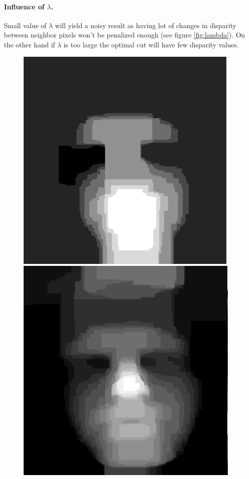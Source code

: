 \documentclass[]{article}
\begin{document}
\paragraph{Influence of $\lambda$.}
Small value of $\lambda$ will yield a noisy result as having lot of changes in disparity between neighbor pixels won't be penalized enough (see figure \ref{fig:lambda}). On the other hand if $\lambda$ is too large the optimal cut will have few disparity values.
\begin{figure}[h]
	\centering
	\begin{minipage}{0.24\linewidth}
		\includegraphics[width=\linewidth]{results/thierry_n3_l20.png}
	\end{minipage}\hfill
	\begin{minipage}{0.24\linewidth}
		\includegraphics[width=\linewidth]{results/thierry_n3_l10.png}

\end{minipage}
\end{figure}
\end{document}
